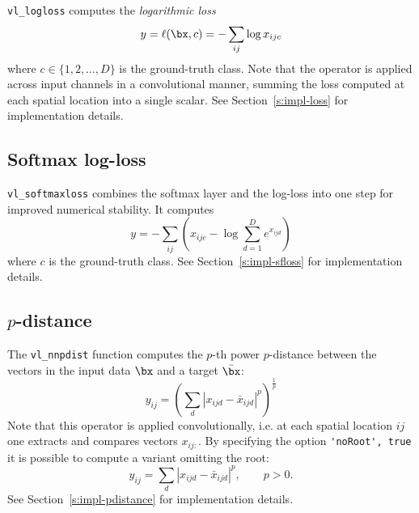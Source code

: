 \verb!vl_logloss! computes the \emph{logarithmic loss}
\[
 y = \ell(\bx,c) = - \sum_{ij} \log x_{ijc}
\]
where $c \in \{1,2,\dots,D\}$ is the ground-truth class. Note that the operator is applied across input channels in a convolutional manner, summing the loss computed at each spatial location into a single scalar.  See Section~\ref{s:impl-loss} for implementation details.

\subsection{Softmax log-loss}\label{s:sfloss}

\verb!vl_softmaxloss! combines the softmax layer and the log-loss into one step for improved numerical stability. It computes
\[
y = - \sum_{ij} \left(
x_{ijc} - \log \sum_{d=1}^D e^{x_{ijd}}
\right)
\]
where $c$ is the ground-truth class. See Section~\ref{s:impl-sfloss} for implementation details.

\subsection{$p$-distance}\label{s:pdistance}

The \verb!vl_nnpdist! function computes the $p$-th power $p$-distance between the vectors in the input data $\bx$ and a target $\bar\bx$:
\[
  y_{ij} = \left(\sum_d |x_{ijd} - \bar x_{ijd}|^p\right)^\frac{1}{p}
\]
Note that this operator is applied convolutionally, i.e. at each spatial location $ij$ one extracts and compares vectors $x_{ij:}$. By specifying the option \verb!'noRoot', true! it is possible to compute a variant omitting the root:
\[
  y_{ij} = \sum_d |x_{ijd} - \bar x_{ijd}|^p, \qquad p > 0.
\]
See Section~\ref{s:impl-pdistance} for implementation details.

